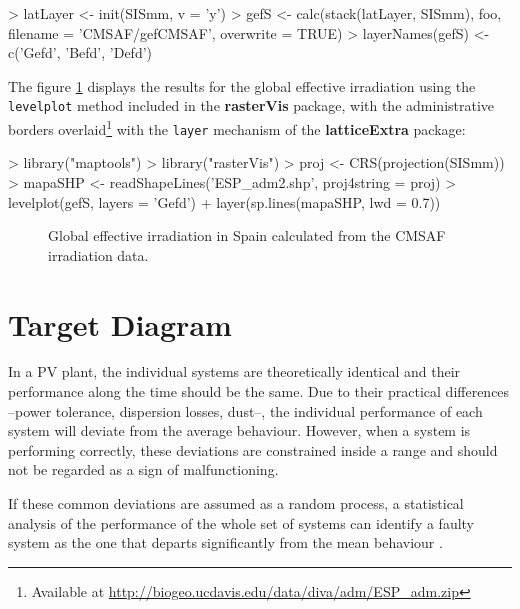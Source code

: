 \documentclass[a4paper]{article}
\renewenvironment{Schunk}{\vspace{\topsep}}{\vspace{\topsep}}
\newcommand{\code}[1]{{\texttt{#1}}}
\newcommand{\pkg}[1]{{\textbf{#1}}}
\begin{document}
\begin{Schunk}
\begin{Sinput}
> latLayer <- init(SISmm, v = 'y')
> gefS <- calc(stack(latLayer, SISmm), foo,
             filename = 'CMSAF/gefCMSAF',
             overwrite = TRUE)
> layerNames(gefS) <- c('Gefd', 'Befd', 'Defd')
\end{Sinput}
\end{Schunk}

The figure \ref{fig:CMSAF} displays the results for the global
effective irradiation using the
\code{levelplot} method included in the \pkg{rasterVis} package, with the administrative borders
overlaid\footnote{Available at
  \url{http://biogeo.ucdavis.edu/data/diva/adm/ESP_adm.zip}} with the
\code{layer} mechanism of the \pkg{latticeExtra} package:

\begin{Schunk}
\begin{Sinput}
> library("maptools")
> library("rasterVis")
> proj <- CRS(projection(SISmm))
> mapaSHP <- readShapeLines('ESP_adm2.shp', proj4string = proj)
> levelplot(gefS, layers = 'Gefd') + layer(sp.lines(mapaSHP, lwd = 0.7))
\end{Sinput}
\end{Schunk}

\begin{figure}
  \centering
  \caption{Global effective irradiation in Spain calculated from the
    CMSAF irradiation data. \label{fig:CMSAF}}
\end{figure}


\section{Target Diagram}
\label{sec:target_diagram}

In a PV plant, the individual systems are theoretically identical and
their performance along the time should be the same. Due to their
practical differences --power tolerance, dispersion losses, dust--,
the individual performance of each system will deviate from the
average behaviour. However, when a system is performing correctly,
these deviations are constrained inside a range and should not be
regarded as a sign of malfunctioning.

If these common deviations are assumed as a random process, a
statistical analysis of the performance of the whole set of systems
can identify a faulty system as the one that departs significantly
from the mean behaviour \cite{Perpinan2009}.
\end{document}
